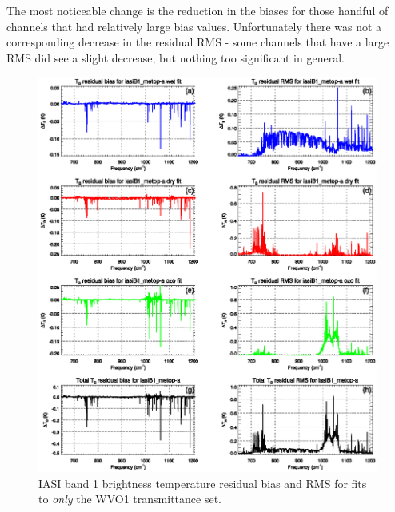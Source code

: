 The most noticeable change is the reduction in the biases for those handful of channels that had relatively large bias values. Unfortunately there was not a corresponding decrease in the residual RMS - some channels that have a large RMS did see a slight decrease, but nothing too significant in general.
\begin{figure}[htp]
  \centering
  \includegraphics[scale=0.8]{graphics/stats/old/iasiB1_metop-a.FitStats.eps}
  \caption{IASI band 1 brightness temperature residual bias and RMS for fits to \emph{only} the WVO1 transmittance set.}
  \label{fig:old_iasiB1_stats}
\end{figure}
